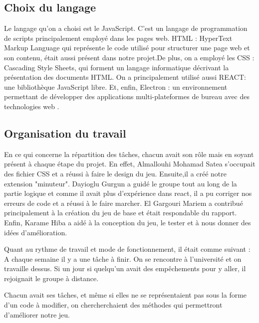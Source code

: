 \documentclass[a4paper, 12pt]{article}
\begin{document}
\subsection{Choix du langage}
Le langage qu’on a choisi est le JavaScript. C'est un langage de programmation de scripts principalement employé dans les pages web. HTML : HyperText Markup Language qui représente le code utilisé pour structurer une page web et son contenu, était aussi présent dans notre projet.De plus, on a employé les CSS : Cascading Style Sheets, qui forment un langage informatique  décrivant la présentation des documents HTML. On a principalement utilisé aussi REACT: une bibliothèque JavaScript libre. Et, enfin, Electron : un environnement permettant de développer des applications multi-plateformes de bureau avec des technologies web .\newline

\subsection{Organisation du travail}

En ce qui concerne la répartition des tâches, chacun avait son rôle mais en soyant présent à chaque étape du projet. \newline
En effet, Almallouhi Mohamad Satea s'occupait des fichier CSS et a réussi à faire le design du jeu. Ensuite,il a créé notre extension "minuteur".\newline
Dayioglu Gurgun a guidé le groupe tout au long de la partie logique et comme il avait plus d'expérience dans react, il a pu corriger nos erreurs de code et a réussi à le faire marcher.\newline
El Gargouri Mariem a contribué principalement à la création du jeu de base et était respondable du rapport. \newline
Enfin, Karame Hiba a aidé à la conception du jeu, le tester et à nous donner des idées d'amélioration.\newline

Quant au rythme de travail et mode de fonctionnement, il était comme suivant :\newline 
A chaque semaine il y a une tâche à finir. On se rencontre à l'université et on travaille dessus. Si un jour si quelqu’un avait des empêchements pour y aller, il rejoignait le groupe à distance.\newline

Chacun avait ses tâches, et même si elles ne se représentaient pas sous la forme d'un code à modifier, on chercherchaient des méthodes qui permettront d’améliorer notre jeu.\newline
\end{document}
